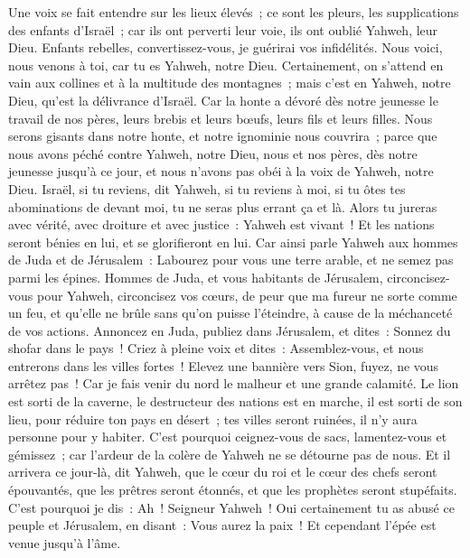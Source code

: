 \begin{multicols}{2}
Une voix se fait entendre sur les lieux élevés~; ce sont les pleurs, les supplications des enfants d'Israël~; car ils ont perverti leur voie, ils ont oublié Yahweh, leur Dieu.
Enfants rebelles, convertissez-vous, je guérirai vos infidélités. Nous voici, nous venons à toi, car tu es Yahweh, notre Dieu.
Certainement, on s'attend en vain aux collines et à la multitude des montagnes~; mais c'est en Yahweh, notre Dieu, qu'est la délivrance d'Israël.
Car la honte a dévoré dès notre jeunesse le travail de nos pères, leurs brebis et leurs bœufs, leurs fils et leurs filles.
Nous serons gisants dans notre honte, et notre ignominie nous couvrira~; parce que nous avons péché contre Yahweh, notre Dieu, nous et nos pères, dès notre jeunesse jusqu'à ce jour, et nous n'avons pas obéi à la voix de Yahweh, notre Dieu.
\VerseOne{}Israël, si tu reviens, dit Yahweh, si tu reviens à moi, si tu ôtes tes abominations de devant moi, tu ne seras plus errant ça et là.
Alors tu jureras avec vérité, avec droiture et avec justice~: Yahweh est vivant~! Et les nations seront bénies en lui, et se glorifieront en lui.
Car ainsi parle Yahweh aux hommes de Juda et de Jérusalem~: Labourez pour vous une terre arable, et ne semez pas parmi les épines.
Hommes de Juda, et vous habitants de Jérusalem, circoncisez-vous pour Yahweh, circoncisez vos cœurs, de peur que ma fureur ne sorte comme un feu, et qu'elle ne brûle sans qu'on puisse l'éteindre, à cause de la méchanceté de vos actions.
Annoncez en Juda, publiez dans Jérusalem, et dites~: Sonnez du shofar dans le pays~! Criez à pleine voix et dites~: Assemblez-vous, et nous entrerons dans les villes fortes~!
Elevez une bannière vers Sion, fuyez, ne vous arrêtez pas~! Car je fais venir du nord le malheur et une grande calamité.
Le lion est sorti de la caverne, le destructeur des nations est en marche, il est sorti de son lieu, pour réduire ton pays en désert~; tes villes seront ruinées, il n'y aura personne pour y habiter.
C'est pourquoi ceignez-vous de sacs, lamentez-vous et gémissez~; car l'ardeur de la colère de Yahweh ne se détourne pas de nous.
Et il arrivera ce jour-là, dit Yahweh, que le cœur du roi et le cœur des chefs seront épouvantés, que les prêtres seront étonnés, et que les prophètes seront stupéfaits.
C'est pourquoi je dis~: Ah~! Seigneur Yahweh~! Oui certainement tu as abusé ce peuple et Jérusalem, en disant~: Vous aurez la paix~! Et cependant l'épée est venue jusqu'à l'âme.

\end{multicols}
